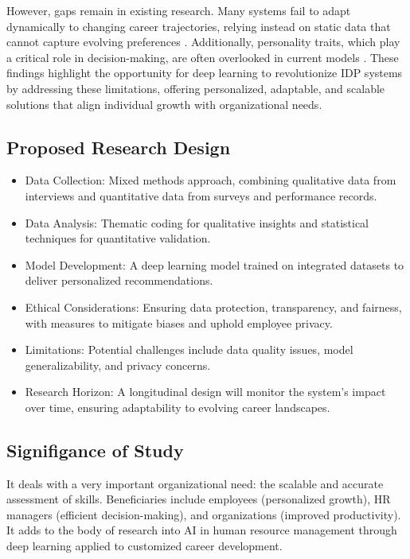 However, gaps remain in existing research. Many systems fail to adapt dynamically to changing career trajectories, relying instead on static data that cannot capture evolving preferences \cite{dabak2022redesigning}. Additionally, personality traits, which play a critical role in decision-making, are often overlooked in current models \cite{ghaffar2022impact}. These findings highlight the opportunity for deep learning to revolutionize IDP systems by addressing these limitations, offering personalized, adaptable, and scalable solutions that align individual growth with organizational needs.

\subsection{Proposed Research Design}

\begin{itemize}
    \item Data Collection: Mixed methods approach, combining qualitative data from interviews and quantitative data from surveys and performance records.
\item Data Analysis: Thematic coding for qualitative insights and statistical techniques for quantitative validation.
\item Model Development: A deep learning model trained on integrated datasets to deliver personalized recommendations.
\item Ethical Considerations: Ensuring data protection, transparency, and fairness, with measures to mitigate biases and uphold employee privacy.
\item Limitations: Potential challenges include data quality issues, model generalizability, and privacy concerns.
\item Research Horizon: A longitudinal design will monitor the system's impact over time, ensuring adaptability to evolving career landscapes.
\end{itemize}


\subsection{Signifigance of Study}
It deals with a very important organizational need: the scalable and accurate assessment of skills.
Beneficiaries include employees (personalized growth), HR managers (efficient decision-making), and organizations (improved productivity).
It adds to the body of research into AI in human resource management through deep learning applied to customized career development.

